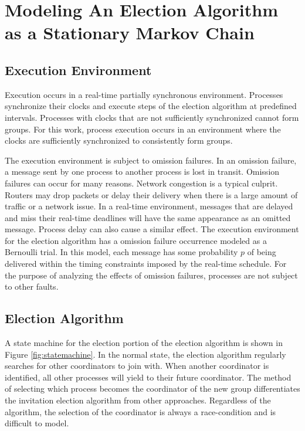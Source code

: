 \section{Modeling An Election Algorithm as a Stationary Markov Chain}



\subsection{Execution Environment}

Execution occurs in a real-time partially synchronous environment.
Processes synchronize their clocks and execute steps of the election algorithm at predefined intervals.
Processes with clocks that are not sufficiently synchronized cannot form groups.
For this work, process execution occurs in an environment where the clocks are sufficiently synchronized to consistently form groups.

The execution environment is subject to omission failures.
In an omission failure, a message sent by one process to another process is lost in transit.
Omission failures can occur for many reasons.
Network congestion is a typical culprit.
Routers may drop packets or delay their delivery when there is a large amount of traffic or a network issue.
In a real-time environment, messages that are delayed and miss their real-time deadlines will have the same appearance as an omitted message.
Process delay can also cause a similar effect.
The execution environment for the election algorithm has a omission failure occurrence modeled as a Bernoulli trial.
In this model, each message has some probability $p$ of being delivered within the timing constraints imposed by the real-time schedule.
For the purpose of analyzing the effects of omission failures, processes are not subject to other faults.

\subsection{Election Algorithm}

A state machine for the election portion of the election algorithm is shown in Figure \ref{fig:statemachine}.
In the normal state, the election algorithm regularly searches for other coordinators to join with.
When another coordinator is identified, all other processes will yield to their future coordinator.
The method of selecting which process becomes the coordinator of the new group differentiates the invitation election algorithm from other approaches.
Regardless of the algorithm, the selection of the coordinator is always a race-condition and is difficult to model.


